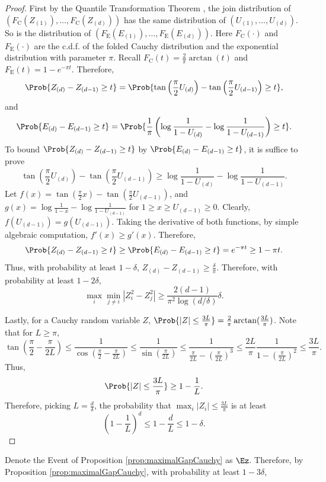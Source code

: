 \begin{proof}
First by the Quantile Transformation Theorem \citep{dasgupta2011finite}, the join distribution of $(F_{\text{C}}(Z_{(1)}), \ldots, F_{\text{C}}(Z_{(d)}))$ has the same distribution of $(U_{(1)}, \ldots, U_{(d)})$. So is the distribution of $(F_{\text{E}}(E_{(1)}), \ldots, F_{\text{E}}(E_{(d)}))$. 
Here $F_{\text{C}}(\cdot)$ and $F_{\text{E}}(\cdot)$ are the c.d.f. of the folded Cauchy distribution and the exponential distribution with parameter $\pi$. 
Recall $F_{\text{C}}(t) = \frac{2}{\pi}\arctan(t)$ and $F_{\text{E}}(t) = 1-e^{-\pi t}$. 
Therefore,
\[
\Prob{ Z_{(d)} - Z_{(d-1)} \ge t} = \Prob{\tan\left(\frac{\pi}{2}U_{(d)} \right) - \tan\left(\frac{\pi}{2}U_{(d-1)}\right) \ge t },
\]
and 
\[
\Prob{E_{(d)} - E_{(d-1)} \ge t} = \Prob{\frac{1}{\pi} \left( \log \frac{1}{1-U_{(d)}} - \log \frac{1}{1-U_{(d-1)}} \right) \ge t}.
\]
To bound $\Prob{ Z_{(d)} - Z_{(d-1)} \ge t}$ by $\Prob{E_{(d)} - E_{(d-1)} \ge t}$, it is suffice to prove 
\[
\tan\left(\frac{\pi}{2}U_{(d)} \right) - \tan\left(\frac{\pi}{2}U_{(d-1)}\right) \ge \log \frac{1}{1-U_{(d)}} - \log \frac{1}{1-U_{(d-1)}} .
\] 
Let $f(x) = \tan\left(\frac{\pi}{2}x \right) - \tan\left(\frac{\pi}{2}U_{(d-1)}\right)$, and $g(x) = \log \frac{1}{1-x} - \log \frac{1}{1-U_{(d-1)}}$ for $1\ge x\ge U_{(d-1)}\ge 0 $.
Clearly, $f(U_{(d-1)}) = g(U_{(d-1)})$. Taking the derivative of both functions, by simple algebraic computation, $f'(x) \ge g'(x)$.
Therefore,
\[
\Prob{ Z_{(d)} - Z_{(d-1)} \ge t} \ge \Prob{E_{(d)} - E_{(d-1)} \ge t} = e^{-\pi t} \ge 1-\pi t.
\]
Thus, with probability at least $1-\delta$, $Z_{(d)} - Z_{(d-1)} \ge \frac{\delta}{\pi}$.
Therefore, with probability at least $1-2\delta$,
\[
\max_i \min_{j\neq i} |Z_i^2 - Z_j^2| \ge \frac{2(d-1)}{\pi^2 \log(d/\delta)}\delta.
\]

Lastly, for a Cauchy random variable $Z$, $\Prob{|Z|\le \frac{3L}{\pi}}  = \frac{2}{\pi}\arctan(\frac{3L}{\pi})$.
Note that for $L\ge \pi$,
\[
\tan(\frac{\pi}{2} - \frac{\pi}{2L}) \le \frac{1}{\cos (\frac{\pi}{2} - \frac{\pi}{2L})} \le \frac{1}{\sin(\frac{\pi}{2L})}\le \frac{1}{\frac{\pi}{2L} - \left( \frac{\pi}{2L}\right)^3}\le \frac{2L}{\pi} \frac{1}{1 - \left(\frac{\pi}{2L}\right)^2} \le \frac{3L}{\pi}.
\]
Thus, 
\[
\Prob{|Z|\le \frac{3L}{\pi}}  \ge 1 - \frac{1}{L}.
\]
Therefore, picking $L = \frac{d}{\delta}$, the probability that $\max_i |Z_i| \le \frac{3L}{\pi}$ is at least 
\[
\left(1-\frac{1}{L}\right)^d \le 1-\frac{d}{L} \le 1-\delta.
\]
\end{proof}
Denote the Event of Proposition \ref{prop:maximalGapCauchy} as $\Ez$.
Therefore, by Proposition \ref{prop:maximalGapCauchy}, with probability at least $1-3\delta$, 
